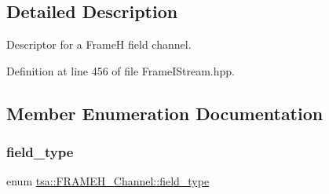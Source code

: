\subsection{Detailed Description}
Descriptor for a FrameH field channel. 

Definition at line 456 of file Frame\+I\+Stream.\+hpp.



\subsection{Member Enumeration Documentation}
\mbox{\label{classtsa_1_1_f_r_a_m_e_h___channel_af9bd3bfda5ebc40f65e8af27abac9fe3}} 
\subsubsection{\texorpdfstring{field\+\_\+type}{field\_type}}
{\footnotesize\ttfamily enum \hyperlink{classtsa_1_1_f_r_a_m_e_h___channel_af9bd3bfda5ebc40f65e8af27abac9fe3}{tsa\+::\+F\+R\+A\+M\+E\+H\+\_\+\+Channel\+::field\+\_\+type}}

